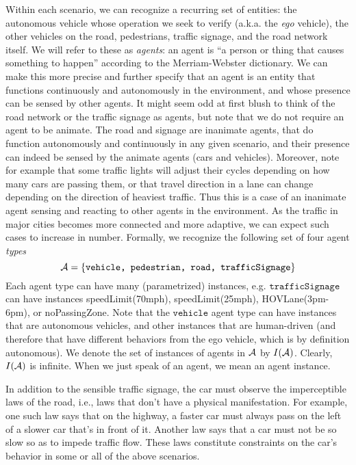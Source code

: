 Within each scenario, we can recognize a recurring set of entities: 
the autonomous vehicle whose operation we seek to verify (a.k.a. the \emph{ego} vehicle), the other vehicles on the road, pedestrians, traffic signage, and the road network itself. 
We will refer to these as \emph{agents}: an agent is ``a person or thing that causes something to happen'' according to the Merriam-Webster dictionary.
We can make this more precise and further specify that an agent is an entity that functions continuously and autonomously in the environment, and whose presence can be sensed by other agents. 
It might seem odd at first blush to think of the road network or the traffic signage as agents, but note that we do not require an agent to be animate.
The road and signage are inanimate agents, that do function autonomously and continuously in any given scenario, and their presence can indeed be sensed by the animate agents (cars and vehicles).
Moreover, note for example that some traffic lights will adjust their cycles depending on how many cars are passing them, or that travel direction in a lane can change depending on the direction of heaviest traffic.
Thus this is a case of an inanimate agent sensing and reacting to other agents in the environment.
As the traffic in major cities becomes more connected and more adaptive, we can expect such cases to increase in number. 
Formally, we recognize the following set of four agent \emph{types}
\[\mathcal{A} = \{\texttt{vehicle, pedestrian, road, trafficSignage}\}\]
Each agent type can have many (parametrized) instances, e.g. $\texttt{trafficSignage}$ can have instances speedLimit(70mph), speedLimit(25mph), HOVLane(3pm-6pm), or noPassingZone.
Note that the $\texttt{vehicle}$ agent type can have instances that are autonomous vehicles, and other instances that are human-driven (and therefore that have different behaviors from the ego vehicle, which is by definition autonomous). 
We denote the set of instances of agents in $\mathcal{A}$ by $I(\mathcal{A})$.
Clearly, $I(\mathcal{A})$ is infinite.
When we just speak of an agent, we mean an agent instance.

In addition to the sensible traffic signage, the car must observe the imperceptible laws of the road, i.e., laws that don't have a physical manifestation. 
For example, one such law says that on the highway, a faster car must always pass on the left of a slower car that's in front of it.
Another law says that a car must not be so slow so as to impede traffic flow. 
These laws constitute constraints on the car's behavior in some or all of the above scenarios.

